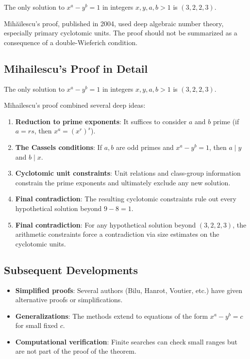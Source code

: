 \begin{theorem}
The only solution to $x^a - y^b = 1$ in integers $x, y, a, b > 1$ is $(3, 2, 2, 3)$.
\end{theorem}

\begin{highlightbox}
Mihăilescu's proof, published in 2004, used deep algebraic number theory, especially primary cyclotomic units. The proof should not be summarized as a consequence of a double-Wieferich condition.
\end{highlightbox}

\subsection{Mihailescu's Proof in Detail}

\begin{theorem}
The only solution to $x^a - y^b = 1$ in integers $x, y, a, b > 1$ is $(3, 2, 2, 3)$.
\end{theorem}

Mihailescu's proof combined several deep ideas:

\begin{enumerate}
\item \textbf{Reduction to prime exponents}: It suffices to consider $a$ and $b$ prime (if $a = rs$, then $x^a = (x^r)^s$).
\item \textbf{The Cassels conditions}: If $a, b$ are odd primes and $x^a - y^b = 1$, then $a \mid y$ and $b \mid x$.
\item \textbf{Cyclotomic unit constraints}: Unit relations and class-group information constrain the prime exponents and ultimately exclude any new solution.
\item \textbf{Final contradiction}: The resulting cyclotomic constraints rule out every hypothetical solution beyond $9-8=1$.
\item \textbf{Final contradiction}: For any hypothetical solution beyond $(3, 2, 2, 3)$, the arithmetic constraints force a contradiction via size estimates on the cyclotomic units.
\end{enumerate}

\subsection{Subsequent Developments}

\begin{itemize}
\item \textbf{Simplified proofs}: Several authors (Bilu, Hanrot, Voutier, etc.) have given alternative proofs or simplifications.
\item \textbf{Generalizations}: The methods extend to equations of the form $x^a - y^b = c$ for small fixed $c$.
\item \textbf{Computational verification}: Finite searches can check small ranges but are not part of the proof of the theorem.
\end{itemize}

